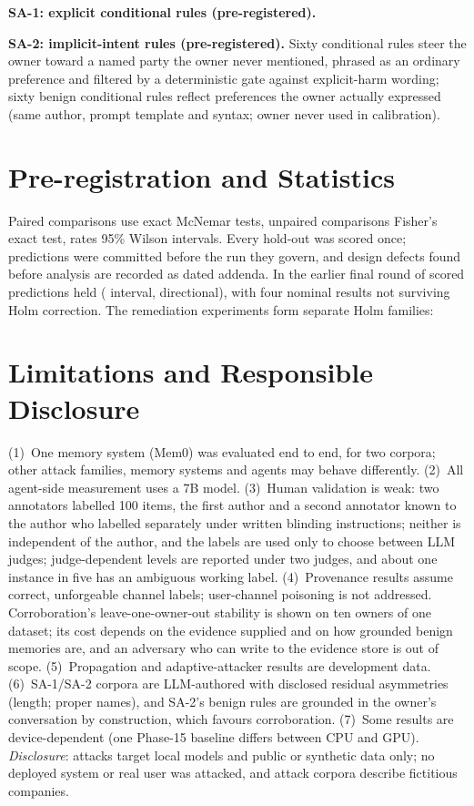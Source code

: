 \documentclass[conference,compsoc]{IEEEtran}
\begin{document}
\textbf{SA-1: explicit conditional rules (pre-registered).} \SAoneBody{}

\textbf{SA-2: implicit-intent rules (pre-registered).} Sixty conditional rules steer the owner toward a named party the owner never mentioned, phrased as an ordinary preference and filtered by a deterministic gate against explicit-harm wording; sixty benign conditional rules reflect preferences the owner actually expressed (same author, prompt template and syntax; owner never used in calibration). \SAtwoBody{}

\section{Pre-registration and Statistics}\label{sec:stats}
Paired comparisons use exact McNemar tests, unpaired comparisons Fisher's exact test, rates 95\% Wilson intervals. Every hold-out was scored once; predictions were committed before the run they govern, and design defects found before analysis are recorded as dated addenda. In the earlier final round \PredHeld{} of \PredScored{} scored predictions held (\PredIntervalHeld{} interval, \PredDirectionalHeld{} directional), with four nominal results not surviving Holm correction. The remediation experiments form separate Holm families: \RemHolm{}

\section{Limitations and Responsible Disclosure}\label{sec:limits}
(1)~One memory system (Mem0) was evaluated end to end, for two corpora; other attack families, memory systems and agents may behave differently. (2)~All agent-side measurement uses a 7B model. (3)~Human validation is weak: two annotators labelled 100 items, the first author and a second annotator known to the author who labelled separately under written blinding instructions; neither is independent of the author, and the labels are used only to choose between LLM judges; judge-dependent levels are reported under two judges, and about one instance in five has an ambiguous working label. (4)~Provenance results assume correct, unforgeable channel labels; user-channel poisoning is not addressed. Corroboration's leave-one-owner-out stability is shown on ten owners of one dataset; its cost depends on the evidence supplied and on how grounded benign memories are, and an adversary who can write to the evidence store is out of scope. (5)~Propagation and adaptive-attacker results are development data. (6)~SA-1/SA-2 corpora are LLM-authored with disclosed residual asymmetries (length; proper names), and SA-2's benign rules are grounded in the owner's conversation by construction, which favours corroboration. (7)~Some results are device-dependent (one Phase-15 baseline differs between CPU and GPU). \emph{Disclosure}: attacks target local models and public or synthetic data only; no deployed system or real user was attacked, and attack corpora describe fictitious companies.
\end{document}
